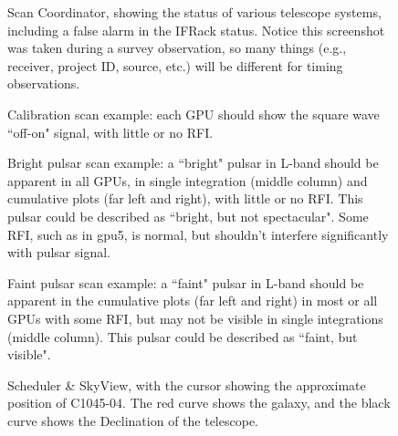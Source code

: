 \documentclass[11pt, reqno, tbtags]{article}
\begin{document}
\begin{figure}[h]
 \centering
  \caption{Scan Coordinator, showing the status of various telescope systems, including a false alarm in the IFRack status. Notice this screenshot was taken during a survey observation, so many things (e.g., receiver, project ID, source, etc.) will be different for timing observations.  }
  \label{fig:sc}
\end{figure}


\begin{figure}[h]
 \centering
  \caption{Calibration scan example: each GPU should show the square wave ``off-on" signal, with little or no RFI.}
  \label{fig:cal}
\end{figure}


\begin{figure}[h]
 \centering
  \caption{Bright pulsar scan example: a ``bright" pulsar in L-band should be apparent in all GPUs, in single integration (middle column) and cumulative plots (far left and right), with little or no RFI.  This pulsar could be described as ``bright, but not spectacular".  Some RFI, such as in gpu5, is normal, but shouldn't interfere significantly with pulsar signal.}
  \label{fig:bright}
\end{figure}


\begin{figure}[h]
 \centering
  \caption{Faint pulsar scan example: a ``faint" pulsar in L-band should be apparent in the cumulative plots (far left and right) in most or all GPUs with some RFI, but may not be visible in single integrations (middle column).  This pulsar could be described as ``faint, but visible".}
  \label{fig:faint}
\end{figure}


\begin{figure}[h]
 \centering
  \caption{Scheduler \& SkyView, with the cursor showing the approximate position of C1045-04.  The red curve shows the galaxy, and the black curve shows the Declination of the telescope.}
  \label{fig:ssv}
\end{figure}
\end{document}
